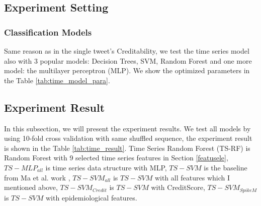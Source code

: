 \subsection{Experiment Setting } 
\label{cha:Data_Collection}


 \subsubsection{Classification Models } 
Same reason as in the single tweet's Creditability, we test the time series model also with 3 popular models: Decision Trees, SVM,  Random Forest and one more model: the multilayer perceptron (MLP). We show the optimized parameters in the Table \ref{tab:time_model_para}.  

\begin{table}[!h]
 \centering
{}
 \caption{Parameters of Classification models}
 \label{tab:time_model_para}
\end{table}


 
  \subsection{Experiment Result} 
 In this subsection, we will present the experiment results. We test all models by using 10-fold cross validation with same shuffled sequence, the experiment result is shown in the Table \ref{tab:time_result}. Time Series Random Forest (TS-RF) is Random Forest with 9 selected time series features in Section \ref{featusele}, $TS-MLP_{all}$ is time series data structure with MLP, $TS-SVM$ is the baseline from Ma et al. work \cite{ma2015detect}, $TS-SVM_{all}$ is $TS-SVM$ with all features which I mentioned above, $TS-SVM_{Credit}$ is $TS-SVM$ with CreditScore, $TS-SVM_{SpikeM}$ is $TS-SVM$ with epidemiological features.
  
